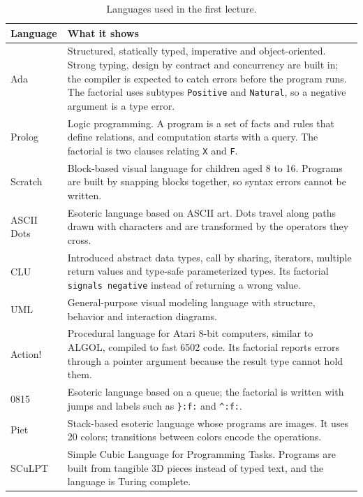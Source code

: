 \begin{table}[h]
\centering
\small
\begin{tabular}{l p{}}
  \toprule
  Language & What it shows \\
  \midrule
  Ada & Structured, statically typed, imperative and object-oriented. Strong
        typing, design by contract and concurrency are built in; the
        compiler is expected to catch errors before the program runs. The
        factorial uses subtypes \texttt{Positive} and \texttt{Natural}, so a
        negative argument is a type error. \\
  Prolog & Logic programming. A program is a set of facts and rules that
           define relations, and computation starts with a query. The
           factorial is two clauses relating \texttt{X} and \texttt{F}. \\
  Scratch & Block-based visual language for children aged 8 to 16. Programs
            are built by snapping blocks together, so syntax errors cannot
            be written. \\
  ASCII Dots & Esoteric language based on ASCII art. Dots travel along paths
               drawn with characters and are transformed by the operators
               they cross. \\
  CLU & Introduced abstract data types, call by sharing, iterators, multiple
        return values and type-safe parameterized types. Its factorial
        \texttt{signals negative} instead of returning a wrong value. \\
  UML & General-purpose visual modeling language with structure, behavior
        and interaction diagrams. \\
  Action! & Procedural language for Atari 8-bit computers, similar to
            ALGOL, compiled to fast 6502 code. Its factorial reports errors
            through a pointer argument because the result type cannot hold
            them. \\
  0815 & Esoteric language based on a queue; the factorial is written with
         jumps and labels such as \texttt{\}:f:} and \texttt{\^{}:f:}. \\
  Piet & Stack-based esoteric language whose programs are images. It uses 20
         colors; transitions between colors encode the operations. \\
  SCuLPT & Simple Cubic Language for Programming Tasks. Programs are built
           from tangible 3D pieces instead of typed text, and the language
           is Turing complete. \\
  \bottomrule
\end{tabular}
\caption{Languages used in the first lecture.}
\label{tab:languages}
\end{table}


